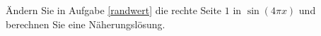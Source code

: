 \begin{aufg}[0]
Ändern Sie in Aufgabe \ref{randwert} die rechte Seite $1$ in
  $\sin(4 \pi x)$ und berechnen Sie eine Näherungslösung. 
\end{aufg}
